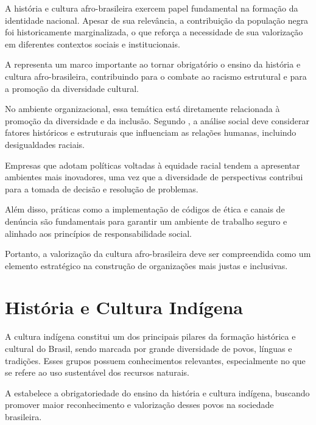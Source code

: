 \documentclass[
    12pt
    ,oneside
    ,a4paper
    ,chapter=TITLE
    ,section=TITLE
    ,sumario=abnt-6027-2012]{abntex2}
\begin{document}
A história e cultura afro-brasileira exercem papel fundamental na formação da identidade nacional. Apesar de sua relevância, a contribuição da população negra foi historicamente marginalizada, o que reforça a necessidade de sua valorização em diferentes contextos sociais e institucionais.

A  representa um marco importante ao tornar obrigatório o ensino da história e cultura afro-brasileira, contribuindo para o combate ao racismo estrutural e para a promoção da diversidade cultural.

No ambiente organizacional, essa temática está diretamente relacionada à promoção da diversidade e da inclusão. Segundo , a análise social deve considerar fatores históricos e estruturais que influenciam as relações humanas, incluindo desigualdades raciais.

Empresas que adotam políticas voltadas à equidade racial tendem a apresentar ambientes mais inovadores, uma vez que a diversidade de perspectivas contribui para a tomada de decisão e resolução de problemas.

Além disso, práticas como a implementação de códigos de ética e canais de denúncia são fundamentais para garantir um ambiente de trabalho seguro e alinhado aos princípios de responsabilidade social.

Portanto, a valorização da cultura afro-brasileira deve ser compreendida como um elemento estratégico na construção de organizações mais justas e inclusivas.

\chapter{História e Cultura Indígena}

A cultura indígena constitui um dos principais pilares da formação histórica e cultural do Brasil, sendo marcada por grande diversidade de povos, línguas e tradições. Esses grupos possuem conhecimentos relevantes, especialmente no que se refere ao uso sustentável dos recursos naturais.

A  estabelece a obrigatoriedade do ensino da história e cultura indígena, buscando promover maior reconhecimento e valorização desses povos na sociedade brasileira.
\end{document}
